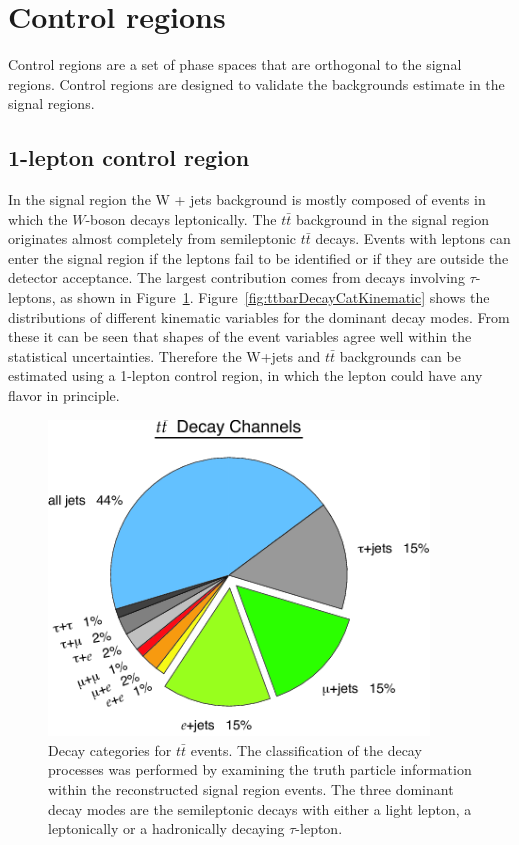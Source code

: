 \section{Control regions}
\label{sec:ana-sig:ctlreg}
\par Control regions are a set of phase spaces that are orthogonal to the signal regions. 
Control regions are designed to validate the backgrounds estimate in the signal regions.

\subsection{1-lepton control region}
\par In the signal region the W + jets background is mostly composed of events in which the $W$-boson decays leptonically. 
The $t\bar{t}$ background in the signal region originates almost completely from semileptonic $t\bar{t}$ decays. 
Events with leptons can enter the signal region if the leptons fail to be identified or if they are outside the detector acceptance. 
The largest contribution comes from decays involving $\tau$-leptons, as shown in Figure~\ref{fig:ttbarDecayCat}. 
Figure~\ref{fig:ttbarDecayCatKinematic} shows the distributions of different kinematic variables for the dominant decay modes. 
From these it can be seen that shapes of the event variables agree well within the statistical uncertainties. 
Therefore the W+jets and $t\bar{t}$ backgrounds can be estimated using a 1-lepton control region, in which the lepton could have any flavor in principle.

\begin{figure}[h]
    \centering
    \includegraphics[width=0.9\textwidth]{chapters/c7/figures/ttbar-decay-modes.png}
    \caption{Decay categories for $t\bar{t}$ events. The classification of the decay processes was performed by examining the truth particle information within the reconstructed signal region events. The three dominant decay modes are the semileptonic decays with either a light lepton, a leptonically or a hadronically decaying $\tau$-lepton.}
    \label{fig:ttbarDecayCat}
\end{figure}

